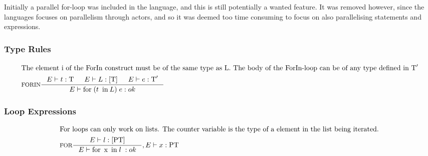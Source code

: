 Initially a parallel for-loop was included in the language, and this is still potentially a wanted feature. It was removed however, since the languages focuses on parallelism through actors, and so it was deemed too time consuming to focus on also parallelising statements and expressions.

\subsubsection{Type Rules}

\begin{align*}
\intertext{The element i of the ForIn construct must be of the same type as L. The body of the ForIn-loop can be of any type defined in $\Tt'$}
&\inference[FORIN]{\Tenv t : \Tt &
                   \Tenv L : [\Tt] &
                  \Tenv e : \Tt'}
                 {\Tenv \mathbin{\text{for}} \; (t \; \mathbin{\text{in}} L) \; {e}: ok}
\end{align*}

\subsubsection{Loop Expressions}
\begin{align*}
\intertext{For loops can only work on lists. The counter variable is the type of a element in the list being iterated.}
&\inference[FOR]{\Tenv l : [\Tpt]}
                 {\Tenv \mathbin{\text{for}} \; \mathbin{\text{x}} \; \mathbin{\text{in}} \; {l} \; : ok },	 \Tenv x : \Tpt
\end{align*}

